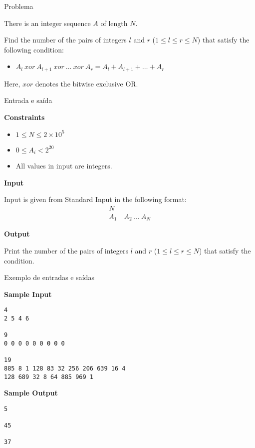 
\begin{frame}[fragile]{Problema}

There is an integer sequence $A$ of length $N$.

Find the number of the pairs of integers $l$ and $r$ ($1\leq l\leq r\leq N$) that satisfy the 
following condition:

\begin{itemize}
    \item $A_l\ xor\ A_{l + 1}\ xor\ \ldots\ xor\ A_r = A_l + A_{l + 1} + \ldots + A_r$
\end{itemize}

Here, $xor$ denotes the bitwise exclusive OR.
\end{frame}

\begin{frame}[fragile]{Entrada e saída}

\textbf{Constraints}

\begin{itemize}
    \item $1\leq N \leq 2\times 10^5$
    \item $0\leq A_i < 2^{20}$
    \item All values in input are integers.
\end{itemize}

\textbf{Input}

Input is given from Standard Input in the following format:
\begin{align*}
N &\\
A_1 &\ A_2\ \ldots\ A_N
\end{align*}

\textbf{Output}

Print the number of the pairs of integers $l$ and $r$ ($1\leq l\leq r\leq N$) that satisfy the 
condition.

\end{frame}

\begin{frame}[fragile]{Exemplo de entradas e saídas}

\begin{minipage}[t]{0.6\textwidth}
\textbf{Sample Input}
\begin{verbatim}
4
2 5 4 6

9
0 0 0 0 0 0 0 0 0

19
885 8 1 128 83 32 256 206 639 16 4
128 689 32 8 64 885 969 1
\end{verbatim}
\end{minipage}
\begin{minipage}[t]{0.35\textwidth}
\textbf{Sample Output}
\begin{verbatim}
5

45

37
\end{verbatim}
\end{minipage}
\end{frame}

